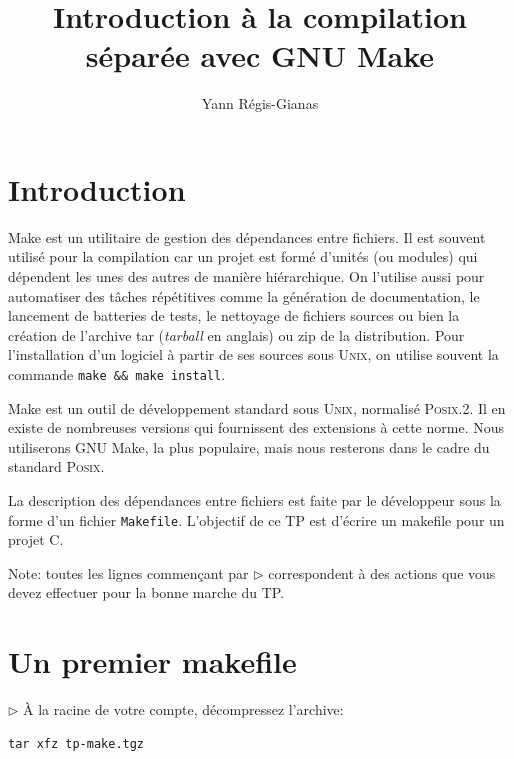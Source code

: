 \documentclass[11pt,a4paper]{article}
\title{Introduction \`a la compilation séparée avec GNU Make}
\author{Yann Régis-Gianas}
\newcommand{\must}{\noindent $\triangleright$ \xspace}
\begin{document}
\maketitle

\section{Introduction}

\textsf{Make} est un utilitaire de gestion des dépendances entre
fichiers. Il est souvent utilisé pour la compilation car un projet est
formé d'unités (ou modules) qui dépendent les unes des autres de
manière hiérarchique. On l'utilise aussi pour automatiser des tâches
répétitives comme la génération de documentation, le lancement de
batteries de tests, le nettoyage de fichiers sources ou bien la
création de l'archive \textsf{tar} (\emph{tarball} en anglais) ou
\textsf{zip} de la distribution. Pour l'installation d'un logiciel à
partir de ses sources sous \textsc{Unix}, on utilise souvent la commande
{\small \verb!make && make install!}.

\textsf{Make} est un outil de développement standard sous \textsc{Unix},
normalisé \textsc{Posix.2}. Il en existe de nombreuses versions qui
fournissent des extensions à cette norme. Nous utiliserons
\textsf{GNU Make}, la plus populaire, mais nous resterons dans le cadre
du standard \textsc{Posix}.

La description des dépendances entre fichiers est faite par le
développeur sous la forme d'un fichier \texttt{Makefile}. L'objectif
de ce TP est d'écrire un makefile pour un projet C.

Note: toutes les lignes commençant par \must correspondent à des
actions que vous devez effectuer pour la bonne marche du TP.


\section{Un premier makefile}

\must À la racine de votre compte, décompressez l'archive:
{\small
\begin{verbatim}
tar xfz tp-make.tgz
\end{verbatim}
}
\end{document}
